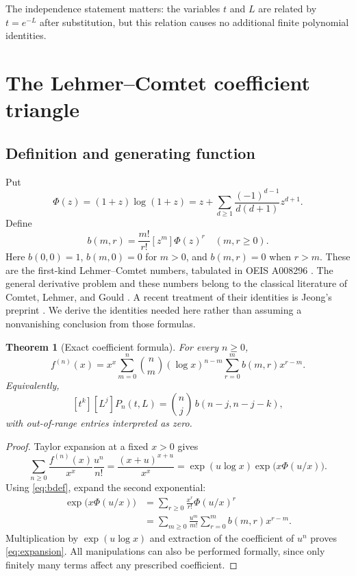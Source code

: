 \documentclass[11pt,a4paper]{article}
\numberwithin{equation}{section}
\newtheorem{theorem}{Theorem}[section]
\theoremstyle{definition}
\theoremstyle{remark}
\newcommand{\coef}[2]{[#1^{#2}]}
\begin{document}
The independence statement matters: the variables $t$ and $L$ are related
by $t=e^{-L}$ after substitution, but this relation causes no additional
finite polynomial identities.

\section{The Lehmer--Comtet coefficient triangle}

\subsection{Definition and generating function}
Put
\begin{equation}\label{eq:phi}
 \Phi(z)=(1+z)\log(1+z)
 =z+\sum_{d\ge1}\frac{(-1)^{d-1}}{d(d+1)}z^{d+1}.
\end{equation}
Define
\begin{equation}\label{eq:bdef}
 b(m,r)=\frac{m!}{r!}\coef{z}{m}\Phi(z)^r
 \quad(m,r\ge0).
\end{equation}
Here $b(0,0)=1$, $b(m,0)=0$ for $m>0$, and $b(m,r)=0$ when $r>m$.
These are the first-kind Lehmer--Comtet numbers, tabulated in OEIS A008296
\cite{oeis8296}. The general derivative problem and these numbers belong to
the classical literature of Comtet, Lehmer, and Gould
\cite{comtet,lehmer,gould}. A recent treatment of their identities is
Jeong's preprint \cite{jeong}. We derive the identities needed here rather
than assuming a nonvanishing conclusion from those formulas.

\begin{theorem}[Exact coefficient formula]\label{thm:expansion}
For every $n\ge0$,
\begin{equation}\label{eq:expansion}
 \boxed{\displaystyle
 f^{(n)}(x)=x^x\sum_{m=0}^n\binom nm (\log x)^{n-m}
                         \sum_{r=0}^m b(m,r)x^{r-m}.}
\end{equation}
Equivalently,
\begin{equation}\label{eq:cformula}
 \coef{t}{k}\coef{L}{j}P_n(t,L)
 =\binom nj\,b(n-j,n-j-k),
\end{equation}
with out-of-range entries interpreted as zero.
\end{theorem}
\begin{proof}
Taylor expansion at a fixed $x>0$ gives
\[
 \sum_{n\ge0}\frac{f^{(n)}(x)}{x^x}\frac{u^n}{n!}
 =\frac{(x+u)^{x+u}}{x^x}
 =\exp(u\log x)\exp\bigl(x\Phi(u/x)\bigr).
\]
Using \eqref{eq:bdef}, expand the second exponential:
\begin{align*}
 \exp\bigl(x\Phi(u/x)\bigr)
 &=\sum_{r\ge0}\frac{x^r}{r!}\Phi(u/x)^r\\
 &=\sum_{m\ge0}\frac{u^m}{m!}\sum_{r=0}^m b(m,r)x^{r-m}.
\end{align*}
Multiplication by $\exp(u\log x)$ and extraction of the coefficient of
$u^n$ proves \eqref{eq:expansion}. All manipulations can also be performed
formally, since only finitely many terms affect any prescribed coefficient.
\end{proof}
\end{document}
